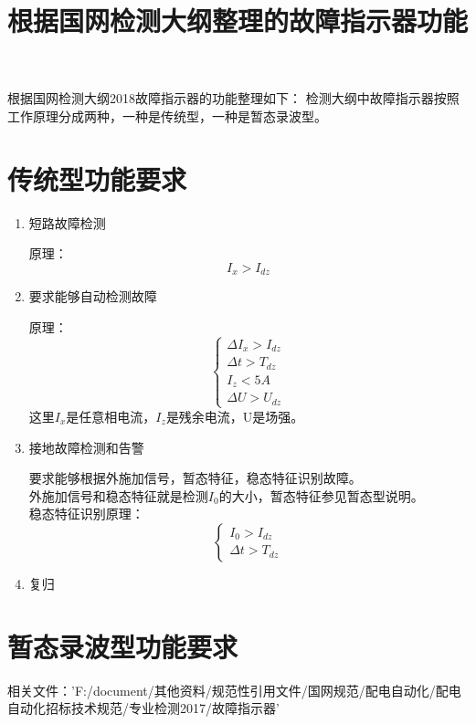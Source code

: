 \documentclass{article}
\begin{document}
\begin{CJK}{UTF8}{gbsn}
\title{根据国网检测大纲整理的故障指示器功能}
\maketitle
根据国网检测大纲2018故障指示器的功能整理如下：
检测大纲中故障指示器按照工作原理分成两种，一种是传统型，一种是暂态录波型。

\section{传统型功能要求}
\begin{enumerate}
\item	短路故障检测
\par
	原理：
	\begin{equation}
		I_x>I_{dz}
	\end{equation}
\item	要求能够自动检测故障
\par
	原理：
	\begin{equation}	
		\left\{ \begin{array}{c}
			\Delta I_x>I_{dz} \\
			\Delta t>T_{dz} \\
			I_z<5A\\ 
			\Delta U>U_{dz}
		\end{array}
		\right .
	\end{equation}
	这里$I_x$是任意相电流，$I_z$是残余电流，U是场强。
\item	接地故障检测和告警
	\par
	要求能够根据外施加信号，暂态特征，稳态特征识别故障。\\
	外施加信号和稳态特征就是检测$I_0$的大小，暂态特征参见暂态型说明。\\
	稳态特征识别原理：
	\begin{equation}
		\left\{
			\begin{array}{ccc}
				I_0>I_{dz}\\
				\Delta t>T_{dz}
			\end{array}
			\right .
	\end{equation}
\item	复归
	\par

\end{enumerate}
\section{暂态录波型功能要求}


相关文件：'F:/document/其他资料/规范性引用文件/国网规范/配电自动化/配电自动化招标技术规范/专业检测2017/故障指示器'
\end{CJK}
\end{document}
